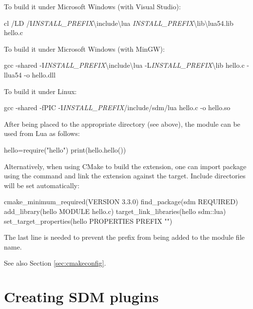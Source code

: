 \documentclass[a4paper,12pt,twoside,extrafontsizes]{memoir}
\begin{document}
To build it under Microsoft Windows (with Visual Studio):

\begin{shellcmds}
cl /LD /I\emph{INSTALL\_PREFIX}\textbackslash{}include\textbackslash{}lua
    \emph{INSTALL\_PREFIX}\textbackslash{}lib\textbackslash{}lua54.lib hello.c
\end{shellcmds}

To build it under Microsoft Windows (with MinGW):

\begin{shellcmds}
gcc -shared -I\emph{INSTALL\_PREFIX}\textbackslash{}include\textbackslash{}lua
    -L\emph{INSTALL\_PREFIX}\textbackslash{}lib hello.c -llua54 -o hello.dll
\end{shellcmds}

To build it under Linux:

\begin{shellcmds}
gcc -shared -fPIC -I\emph{INSTALL\_PREFIX}/include/sdm/lua
    hello.c -o hello.so
\end{shellcmds}

After being placed to the appropriate directory (see above), the module can be used from Lua as follows:

\begin{shellcmds}\begin{luacode}
hello=require("hello")
print(hello.hello())
\end{luacode}\end{shellcmds}

Alternatively, when using CMake to build the extension, one can import  package using the  command and link the extension against the  target. Include directories will be set automatically:

\begin{shellcmds}
cmake\_minimum\_required(VERSION 3.3.0)
find\_package(sdm REQUIRED)
add\_library(hello MODULE hello.c)
target\_link\_libraries(hello sdm::lua)
set\_target\_properties(hello PROPERTIES PREFIX "")
\end{shellcmds}

The last line is needed to prevent the  prefix from being added to the module file name.

See also Section \ref{sec:cmakeconfig}.

\chapter{Creating SDM plugins}
\label{ch:sdk}
\end{document}
